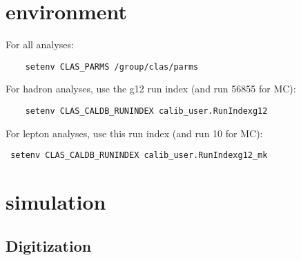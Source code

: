 \documentclass[10pt,twocolumn,oneside,letterpaper]{article}
\begin{document}
\renewcommand{\thefootnote}{\fnsymbol{footnote}}

\pagestyle{empty}
\thispagestyle{empty}


\section{environment}

\small

For all analyses:
\begin{verbatim}
    setenv CLAS_PARMS /group/clas/parms
\end{verbatim}
For hadron analyses, use the g12 run index (and run 56855 for MC):
\begin{verbatim}
    setenv CLAS_CALDB_RUNINDEX calib_user.RunIndexg12
\end{verbatim}
For lepton analyses, use this run index (and run 10 for MC):
\begin{verbatim}
 setenv CLAS_CALDB_RUNINDEX calib_user.RunIndexg12_mk
\end{verbatim}

\section{simulation}

\subsection{Digitization}
\end{document}

